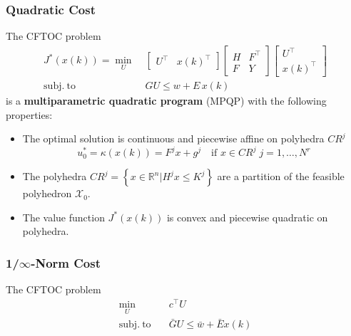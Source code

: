 \subsubsection{Quadratic Cost}
The CFTOC problem
\begin{align*}
    J^*(x(k)) = \min_U \; & \begin{bmatrix}
                                U^\top & {x(k)}^\top
                            \end{bmatrix}\begin{bmatrix}
                                             H & F^\top \\
                                             F & Y
                                         \end{bmatrix}\begin{bmatrix}
                                                          U^\top \\ {x(k)}^\top
                                                      \end{bmatrix} \\
    \mathrm{subj.\ to}\;  & GU\leq w+E\, x(k)
\end{align*}
is a \textbf{multiparametric quadratic program} (MPQP) with the following properties:
\begin{itemize}
    \item The optimal solution is continuous and piecewise affine on polyhedra $CR^j$
          \begin{equation*}
              u_0^* = \kappa(x(k)) = F^j x + g^j \quad \text{if } x\in CR^j\; j=1,\ldots, N^r
          \end{equation*}
    \item The polyhedra $CR^j = \left\{ x\in \mathbb{R}^n \Big| H^j x \leq K^j \right\}$ are a partition of the feasible polyhedron $\mathcal{X}_0$.
    \item The value function $J^*(x(k))$ is convex and piecewise quadratic on polyhedra.
\end{itemize}


\subsubsection[1/inf-Norm Cost]{1/$\infty$-Norm Cost}
The CFTOC problem
\begin{align*}
    \min_U \quad            & c^\top U                              \\
    \mathrm{subj.\ to}\quad & \bar{G} U \leq \bar{w} + \bar{E} x(k) \\
\end{align*}

